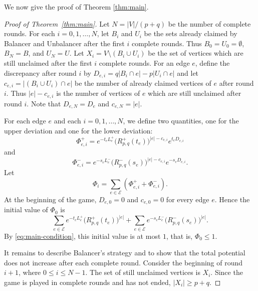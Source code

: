 \documentclass[twoside,12pt]{article}
\numberwithin{equation}{section}
\begin{document}
We now give the proof of Theorem \ref{thm:main}.
\begin{proof}[Proof of Theorem~\ref{thm:main}]
 Let
$N=|V|/(p+q)$
be the number of complete rounds.  For each $i=0,1,\ldots,N$, let $B_i$ and $U_i$ be the sets already claimed by Balancer and Unbalancer after the first $i$ complete rounds.  Thus
$B_0=U_0=\emptyset$,
$B_N=B$,
and $U_N=U$.
Let
$X_i=V\setminus (B_i\cup U_i)$
be the set of vertices which are still unclaimed after the first $i$ complete rounds.
For an edge $e$, define the discrepancy after round $i$ by
$D_{e,i}=q|B_i\cap e|-p|U_i\cap e|$
and let
$c_{e,i}=|(B_i\cup U_i)\cap e|$
be the number of already claimed vertices of $e$ after round $i$. Thus $|e|-c_{e,i}$ is the number of vertices of $e$ which are still unclaimed after round $i$. Note that $D_{e,N}=D_e$ and $c_{e,N}=|e|$.

For each edge $e$ and each $i=0,1,\ldots,N$, we define two quantities, one for the upper deviation and one for the lower deviation:
\[
        \Phi_{e,i}^+
        =
        e^{-t_eL_e^+}
        \bigl(R^+_{p,q}(t_e)\bigr)^{|e|-c_{e,i}}
        e^{t_eD_{e,i}}
\]
and
\[
        \Phi_{e,i}^-
        =
        e^{-s_eL_e^-}
        \bigl(R^-_{p,q}(s_e)\bigr)^{|e|-c_{e,i}}
        e^{-s_eD_{e,i}}.
\]
Let
\begin{equation}\label{equphi-indexed}
    \Phi_i=\sum_{e\in\mathcal E}(\Phi_{e,i}^++\Phi_{e,i}^-).
\end{equation}
At the beginning of the game, $D_{e,0}=0$ and $c_{e,0}=0$ for every edge $e$. Hence the initial value of $\Phi_0$ is
\[
        \sum_{e\in\mathcal E}
        e^{-t_eL_e^+}\bigl(R^+_{p,q}(t_e)\bigr)^{|e|}
        +
        \sum_{e\in\mathcal E}
        e^{-s_eL_e^-}\bigl(R^-_{p,q}(s_e)\bigr)^{|e|}.
\]
By \eqref{eq:main-condition}, this initial value is at most $1$, that is,
$\Phi_0\le1$.

It remains to describe Balancer's strategy and to show that the total potential does not increase after each complete round.  Consider the beginning of round $i+1$, where $0\le i\le N-1$.  The set of still unclaimed vertices is $X_i$.  Since the game is played in complete rounds and has not ended, $|X_i|\ge p+q$.


\end{proof}
\end{document}
